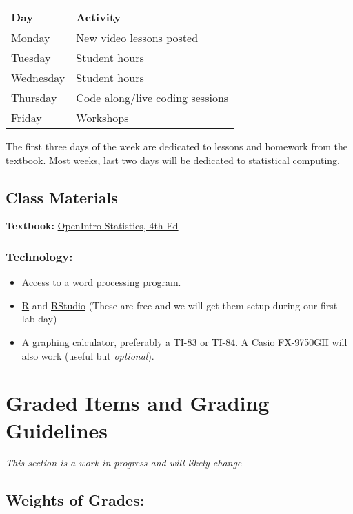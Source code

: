 \documentclass[
]{book}
\providecommand{\tightlist}{%
  \setlength{\itemsep}{0pt}\setlength{\parskip}{0pt}}
\begin{document}
\begin{tabular}{l|l}
\hline
Day & Activity\\
\hline
Monday & New video lessons posted\\
\hline
Tuesday & Student hours\\
\hline
Wednesday & Student hours\\
\hline
Thursday & Code along/live coding sessions\\
\hline
Friday & Workshops\\
\hline
\end{tabular}

The first three days of the week are dedicated to lessons and homework from the textbook. Most weeks, last two days will be dedicated to statistical computing.

\hypertarget{class-materials}{%
\subsection{Class Materials}\label{class-materials}}

\textbf{Textbook:} \href{https://leanpub.com/openintro-statistics}{OpenIntro Statistics, 4th Ed}

\hypertarget{technology}{%
\subsubsection{Technology:}\label{technology}}

\begin{itemize}
\tightlist
\item
  Access to a word processing program.
\item
  \href{https://cran.r-project.org/}{R} and \href{https://rstudio.com/}{RStudio} (These are free and we will get them setup during our first lab day)
\item
  A graphing calculator, preferably a TI-83 or TI-84. A Casio FX-9750GII will also work (useful but \emph{optional}).
\end{itemize}

\hypertarget{graded-items-and-grading-guidelines}{%
\section{Graded Items and Grading Guidelines}\label{graded-items-and-grading-guidelines}}

\emph{This section is a work in progress and will likely change}

\hypertarget{weights-of-grades}{%
\subsection{Weights of Grades:}\label{weights-of-grades}}
\end{document}
